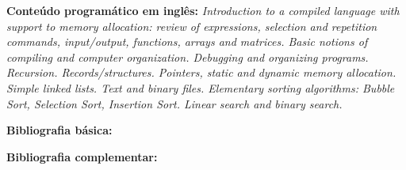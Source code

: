\documentclass[class=article, crop=false]{standalone}
\begin{document}
\textbf{Conteúdo programático em inglês:}
\textit{Introduction to a compiled language with support to memory allocation:
review of expressions, selection and repetition commands, input/output,
functions, arrays and matrices.
Basic notions of compiling and computer organization.
Debugging and organizing programs.
Recursion.
Records/structures.
Pointers, static and dynamic memory allocation.
Simple linked lists.
Text and binary files.
Elementary sorting algorithms: Bubble Sort, Selection Sort, Insertion Sort.
Linear search and binary search.}

\newrefsection
\textbf{Bibliografia básica:}
\nocite{1998-sedgewick, 2005-forbellone-eberspacher, 1989-kernighan-ritchie}
\printbibliography

\newrefsection
\textbf{Bibliografia complementar:}
\nocite{2009-feofiloff,2007-ziviani,2010-szwarcfiter-markenzon,1995-tenenbaum-etal,1997-schildt}
\printbibliography
\end{document}
